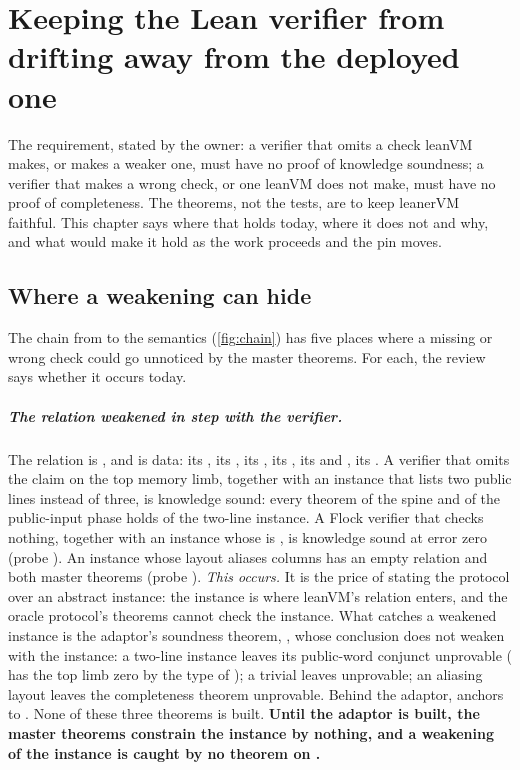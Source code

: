 \chapter[Keeping the Lean verifier from drifting]{Keeping the Lean verifier from drifting away from the deployed one}\label{ch:drift}

The requirement, stated by the owner: a verifier that omits a check leanVM makes, or makes a
weaker one, must have no proof of knowledge soundness; a verifier that makes a wrong check, or
one leanVM does not make, must have no proof of completeness. The theorems, not the tests, are
to keep leanerVM faithful. This chapter says where that holds today, where it does not and why,
and what would make it hold as the work proceeds and the pin moves.

\section{Where a weakening can hide}\label{sec:drift-hiding}

The chain from  to the semantics (\cref{fig:chain}) has five places where a
missing or wrong check could go unnoticed by the master theorems. For each, the review says
whether it occurs today.

\paragraph{The relation weakened in step with the verifier.} The relation is
, and  is data: its , its , its
, its , its  and , its
. A verifier that omits the claim on the top memory limb, together with an
instance that lists two public lines instead of three, is knowledge sound: every theorem of the
spine and of the public-input phase holds of the two-line instance. A Flock verifier that checks
nothing, together with an instance whose  is , is knowledge sound at error
zero (probe ). An instance whose layout aliases columns has an empty
relation and both master theorems (probe ). \emph{This occurs.} It is the
price of stating the protocol over an abstract instance: the instance is where leanVM's
relation enters, and the oracle protocol's theorems cannot check the instance. What catches a
weakened instance is the adaptor's soundness theorem, , whose
conclusion  does not weaken with the instance: a two-line instance leaves its
public-word conjunct unprovable ( has the top limb zero by the type
of ); a trivial  leaves  unprovable; an
aliasing layout leaves the completeness theorem  unprovable. Behind the
adaptor,  anchors  to . None of
these three theorems is built. \textbf{Until the adaptor is built, the master theorems
constrain the instance by nothing, and a weakening of the instance is caught by no theorem on
.}

